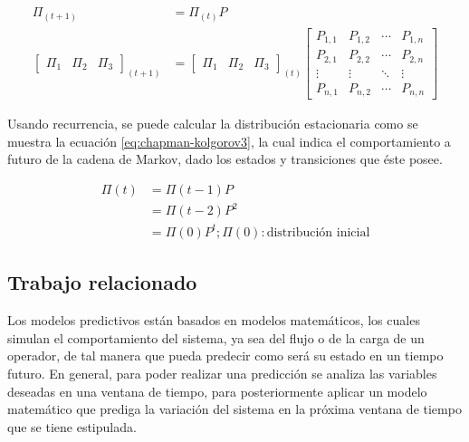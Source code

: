 \begin{equation} \label{eq:chapman-kolgorov2}
\begin{split}
	\Pi_{(t+1)} &= \Pi_{(t)}P\\
	\begin{bmatrix}
		\Pi_1 & \Pi_2 & \Pi_3
	\end{bmatrix} _{(t+1)}
	&= \begin{bmatrix}
		\Pi_1 & \Pi_2 & \Pi_3
	\end{bmatrix} _{(t)}
	\begin{bmatrix}
		P_{1,1} & P_{1,2} & \cdots & P_{1,n} \\
		P_{2,1} & P_{2,2} & \cdots & P_{2,n} \\
		\vdots  & \vdots  & \ddots & \vdots  \\
		P_{n,1} & P_{n,2} & \cdots & P_{n,n}
	\end{bmatrix}
\end{split}
\end{equation}

Usando recurrencia, se puede calcular la distribución estacionaria como se muestra la ecuación \ref{eq:chapman-kolgorov3}, la cual indica el comportamiento a futuro de la cadena de Markov, dado los estados y transiciones que éste posee.

\begin{equation} \label{eq:chapman-kolgorov3}
\begin{split}
	\Pi (t) &= \Pi (t-1)P \\
				  &= \Pi (t-2)P^{2}\\
				  &= \Pi (0)P^{t} ; \Pi (0): \text{distribución inicial}
\end{split}
\end{equation}

\subsection{Trabajo relacionado}
Los modelos predictivos están basados en modelos matemáticos, los cuales simulan el comportamiento del sistema, ya sea del flujo o de la carga de un operador, de tal manera que pueda predecir como será su estado en un tiempo futuro. En general, para poder realizar una predicción se analiza las variables deseadas en una ventana de tiempo, para posteriormente aplicar un modelo matemático que prediga la variación del sistema en la próxima ventana de tiempo que se tiene estipulada.

